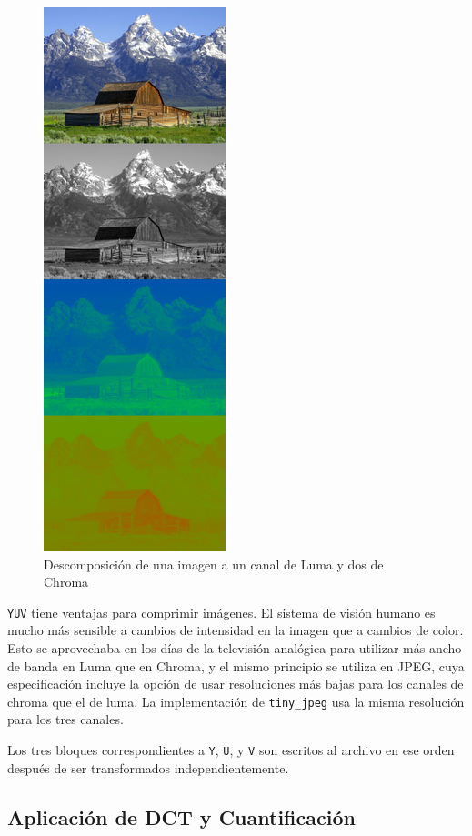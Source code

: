 \begin{figure}
    \includegraphics{yuv}
    \caption{Descomposición de una imagen a un canal de Luma y dos de Chroma}
\end{figure}

\verb+YUV+ tiene ventajas para comprimir imágenes. El sistema de visión humano
es mucho más sensible a cambios de intensidad en la imagen que a cambios de
color. Esto se aprovechaba en los días de la televisión analógica para utilizar
más ancho de banda en Luma que en Chroma, y el mismo principio se utiliza en
JPEG, cuya especificación incluye la opción de usar resoluciones más bajas para
los canales de chroma que el de luma. La implementación de \verb+tiny_jpeg+ usa
la misma resolución para los tres canales.

Los tres bloques correspondientes a \verb+Y+, \verb+U+, y \verb+V+ son escritos
al archivo en ese orden después de ser transformados independientemente.


\subsection{Aplicación de DCT y Cuantificación}\label{sub:vida_dct}

